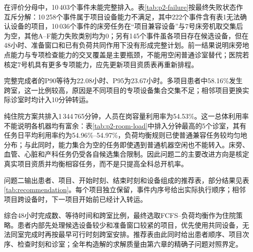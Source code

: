 在评价分母中，10\,403个事件未能完整排入。表\ref{tab:p2-failure}按最终失败状态作互斥分解：10\,258个事件属于项目设备能力不满足，其中222个事件含有表1无法确认设备的项目，10\,036个事件的床旁任务在“项目兼容设备”与7号床旁机取交集后为空，其他A--F能力失败类别均为0；另有145个事件虽各项目存在候选设备，但在48小时、准备窗口和已有负荷共同作用下没有形成完整计划。前一结果说明床旁地点能力与专项检查能力的交叉覆盖是主要瓶颈，不能用空闲普通诊室替代；医院若核定7号机具有更多专项能力，应先更新项目资质表再重新排程。

\begin{table}[H]
\centering
\caption{问题二评价期未完成原因分解}
\label{tab:p2-failure}

\end{table}

完整完成者的P90等待为22.08小时、P95为23.67小时。多项目患者中58.16\%发生跨室，这一比例较高，原因是不同项目的专项设备集合交集不足；相邻项目更换实际诊室时均计入10分钟转运。

纯住院方案共排入1\,344\,765分钟，人员在岗容量利用率为54.53\%。这一总体利用率不能说明各机器均有富余：表\ref{tab:p2-room-load}中排入分钟最高的5个诊室，其有任务日平均利用率约为54.96\%--54.97\%，负荷均衡规则已使普通兼容任务较均匀地分布；与此同时，能力集合为空的任务即使遇到普通机器空闲也不能转入。床旁、血管、心脏和产科任务仍受各自候选集合限制。因此问题二的主要改进方向是核定真实项目资质并均衡相容任务，而不是只提高全科总开机率。

\begin{table}[H]
\centering
\caption{问题二排入分钟最高的诊室}
\label{tab:p2-room-load}

\end{table}

问题二输出患者、项目、开始时刻、结束时刻和设备组成的推荐表，部分结果见表\ref{tab:recommendation}。每个项目独立保留，事件内序号给出实际执行顺序；相邻项目跨设备时，下一项目开始前已经计入转运。

\begin{table}[H]
\centering
\caption{患者级推荐排程样例}
\label{tab:recommendation}

\end{table}

综合48小时完成数、等待时间和跨室比例，最终选取FCFS--负荷均衡作为住院策略。患者内部先处理候选设备较少和准备窗口较紧的项目，优先使用共同设备，无法同室完成时再按最早可行时刻跨室安排。推荐表由此同时给出患者顺序、项目次序、检查时刻和诊室；全年构造解的求解质量由第六章的精确子问题对照界定。

